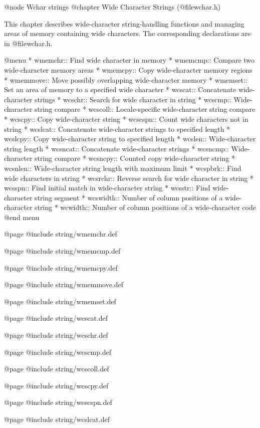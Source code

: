 @node Wchar strings
@chapter Wide Character Strings (@file{wchar.h})

This chapter describes wide-character string-handling functions and
managing areas of memory containing wide characters.  The corresponding 
declarations are in @file{wchar.h}.

@menu
* wmemchr::     Find wide character in memory
* wmemcmp::     Compare two wide-character memory areas
* wmemcpy::     Copy wide-character memory regions
* wmemmove::    Move possibly overlapping wide-character memory
* wmemset::     Set an area of memory to a specified wide character
* wcscat::      Concatenate wide-character strings
* wcschr::      Search for wide character in string
* wcscmp::      Wide-character string compare
* wcscoll::     Locale-specific wide-character string compare
* wcscpy::      Copy wide-character string
* wcscspn::     Count wide characters not in string
* wcslcat::     Concatenate wide-character strings to specified length
* wcslcpy::     Copy wide-character string to specified length
* wcslen::      Wide-character string length
* wcsncat::     Concatenate wide-character strings
* wcsncmp::     Wide-character string compare
* wcsncpy::     Counted copy wide-character string
* wcsnlen::     Wide-character string length with maximum limit
* wcspbrk::     Find wide characters in string
* wcsrchr::     Reverse search for wide character in string
* wcsspn::      Find initial match in wide-character string
* wcsstr::      Find wide-character string segment
* wcswidth::    Number of column positions of a wide-character string
* wcwidth::     Number of column positions of a wide-character code
@end menu

@page
@include string/wmemchr.def

@page
@include string/wmemcmp.def

@page
@include string/wmemcpy.def

@page
@include string/wmemmove.def

@page
@include string/wmemset.def

@page
@include string/wcscat.def

@page
@include string/wcschr.def

@page
@include string/wcscmp.def

@page
@include string/wcscoll.def

@page
@include string/wcscpy.def

@page
@include string/wcscspn.def

@page
@include string/wcslcat.def

